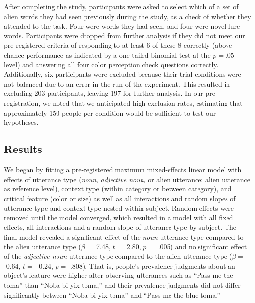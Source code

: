 \documentclass[
  english,
  man,floatsintext]{apa6}
\begin{document}
After completing the study, participants were asked to select which of a set of alien words they had seen previously during the study, as a check of whether they attended to the task. Four were words they had seen, and four were novel lure words. Participants were dropped from further analysis if they did not meet our pre-registered criteria of responding to at least 6 of these 8 correctly (above chance performance as indicated by a one-tailed binomial test at the \(p = .05\) level) and answering all four color perception check questions correctly. Additionally, six participants were excluded because their trial conditions were not balanced due to an error in the run of the experiment. This resulted in excluding 203 participants, leaving 197 for further analysis. In our pre-registration, we noted that we anticipated high exclusion rates, estimating that approximately 150 people per condition would be sufficient to test our hypotheses.

\hypertarget{results-2}{%
\subsection{Results}\label{results-2}}

We began by fitting a pre-registered maximum mixed-effects linear model with effects of utterance type (\emph{noun}, \emph{adjective noun}, or alien utterance; alien utterance as reference level), context type (within category or between category), and critical feature (color or size) as well as all interactions and random slopes of utterance type and context type nested within subject. Random effects were removed until the model converged, which resulted in a model with all fixed effects, all interactions and a random slope of utterance type by subject. The final model revealed a significant effect of the \emph{noun} utterance type compared to the alien utterance type (\(\beta =\) 7.48, \(t =\) 2.80, \(p =\) .005) and no significant effect of the \emph{adjective noun} utterance type compared to the alien utterance type (\(\beta =\) -0.64, \(t =\) -0.24, \(p =\) .808). That is, people's prevalence judgments about an object's feature were higher after observing utterances such as ``Pass me the toma'' than ``Noba bi yix toma,'' and their prevalence judgments did not differ significantly between ``Noba bi yix toma'' and ``Pass me the blue toma.''
\end{document}
